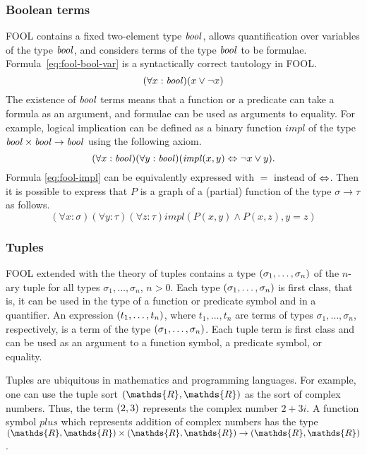 \documentclass{easychair}
\begin{document}
\subsubsection*{Boolean terms}
FOOL contains a fixed two-element type $\mathit{bool}$, allows quantification over 
variables of the type $\mathit{bool}$, and considers terms of the type $\mathit{bool}$ to be
formulae. Formula~\ref{eq:fool-bool-var} is a syntactically correct tautology
in FOOL.
\begin{equation}\label{eq:fool-bool-var}
(\forall x:\mathit{bool})(x \lor \neg x)
\end{equation}
The existence of $\mathit{bool}$ terms means that a function or a predicate can take 
a formula as an argument, and formulae can be used as arguments to equality.
For example, logical implication can be defined as a binary function
$\mathit{impl}$ of the type $\mathit{bool} \times \mathit{bool} \to \mathit{bool}$ using the following
axiom.
\begin{equation}\label{eq:fool-impl}
(\forall x:\mathit{bool})(\forall y:\mathit{bool})(\mathit{impl}(x,y) \Leftrightarrow \neg x \lor y).
\end{equation}
Formula \ref{eq:fool-impl} can be equivalently expressed with $=$ instead of
$\Leftrightarrow$.
Then it is possible to express that $P$ is a graph of a (partial) function of 
the type $\sigma \to \tau$ as follows.
\begin{equation}\label{eq:bool-arg-example}
(\forall x:\sigma)(\forall y:\tau)(\forall z:\tau)
\mathit{impl}(P(x,y) \land P(x,z), y = z)
\end{equation}

\subsubsection*{Tuples}
FOOL extended with the theory of tuples contains a type
$({\sigma_1,\ldots,\sigma_n})$ of the $n$-ary tuple for all types
$\sigma_1,\ldots,\sigma_n$, $n>0$. Each type
$({\sigma_1,\ldots,\sigma_n})$ is first class, that is, it can be
used in the type of a function or predicate symbol and in a
quantifier. An expression $({t_1,\ldots,t_n})$, where $t_1,\ldots,t_n$ are
terms of types $\sigma_1,\ldots,\sigma_n$, respectively, is a term of the type
$({\sigma_1,\ldots,\sigma_n})$. Each tuple term is first class and can be used as an argument to a function symbol, a predicate symbol, or equality.

Tuples are ubiquitous in mathematics and programming languages. For example,
one can use the tuple sort $\tuple{\mathds{R},\mathds{R}}$ as the sort of
complex numbers. Thus, the term $({2,3})$ represents the complex number
$2+3i$. A function symbol $\mathit{plus}$ which represents addition of complex numbers has the type $\tuple{\mathds{R},\mathds{R}} \times \tuple{\mathds{R},\mathds{R}} \to \tuple{\mathds{R},\mathds{R}}$.
\end{document}
